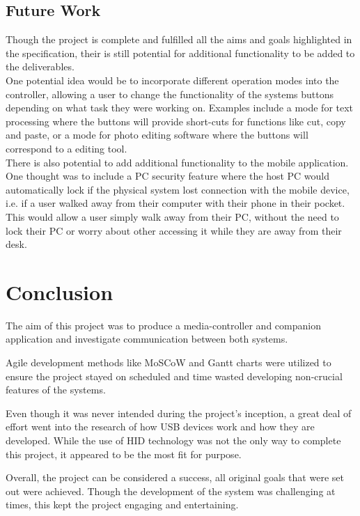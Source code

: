 \documentclass{article}
\begin{document}
		\subsection{Future Work}
			Though the project is complete and fulfilled all the aims and goals highlighted in the specification, their is still potential for additional functionality to be added to the deliverables.\\
			
			\noindent
			One potential idea would be to incorporate different operation modes into the controller, allowing a user to change the functionality of the systems buttons depending on what task they were working on. Examples include a mode for text processing where the buttons will provide short-cuts for functions like cut, copy and paste, or a mode for photo editing software where the buttons will correspond to a editing tool.\\
			
			\noindent
			There is also potential to add additional functionality to the mobile application. One thought was to include a PC security feature where the host PC would automatically lock if the physical system lost connection with the mobile device, i.e. if a user walked away from their computer with their phone in their pocket. This would allow a user simply walk away from their PC, without the need to lock their PC or worry about other accessing it while they are away from their desk.
		
	\section{Conclusion}
		The aim of this project was to produce a media-controller and companion application and investigate communication between both systems. 
		
		Agile development methods like MoSCoW and Gantt charts were utilized to ensure the project stayed on scheduled and time wasted developing non-crucial features of the systems. 
		
		Even though it was never intended during the project's inception, a great deal of effort went into the research of how USB devices work and how they are developed. While the use of HID technology was not the only way to complete this project, it appeared to be the most fit for purpose.
		
		Overall, the project can be considered a success, all original goals that were set out
		were achieved. Though the development of the system was challenging at times, this kept the project engaging and entertaining. 
		
\end{document}

